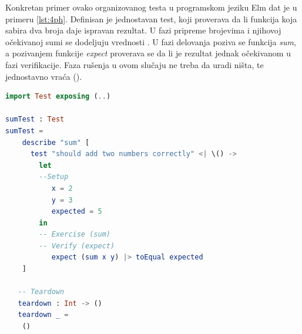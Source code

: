 \documentclass[12pt,oneside]{memoir}
\begin{document}
\par Konkretan primer ovako organizovanog testa u programskom jeziku Elm dat je u primeru \ref{lst:4ph}. Definisan je jednostavan test, koji proverava da li funkcija koja sabira dva broja daje ispravan rezultat. U fazi pripreme brojevima i njihovoj očekivanoj sumi se dodeljuju vrednosti . U fazi delovanja poziva se funkcija \emph{sum}, a pozivanjem funkcije \emph{expect} proverava se da li je rezultat jednak očekivanom u fazi verifikacije. Faza rušenja u ovom slučaju ne treba da uradi ništa, te jednostavno vraća ().

\begin{lstlisting}[language=elm, caption={Četiri faze jediničnog testa},captionpos=b, label={lst:4ph}]
import Test exposing (..)

sumTest : Test
sumTest =
    describe "sum" [
      test "should add two numbers correctly" <| \() -> 
        let
        --Setup
           x = 2
           y = 3
           expected = 5
        in
        -- Exercise (sum)
        -- Verify (expect)
           expect (sum x y) |> toEqual expected
    ]

   -- Teardown
   teardown : Int -> ()
   teardown _ =
    ()
\end{lstlisting}
\end{document}
